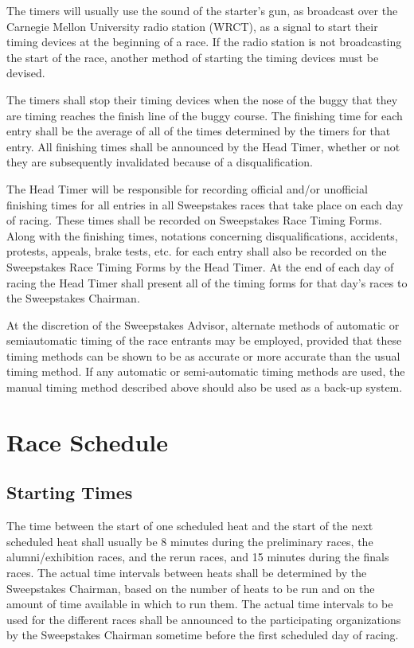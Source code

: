 	The timers will usually use the sound of the starter's gun, as broadcast over the Carnegie Mellon University radio station (WRCT), as a signal to start their timing devices at the beginning of a race. If the radio station is not broadcasting the start of the race, another method of starting the timing devices must be devised.

	The timers shall stop their timing devices when the nose of the buggy that they are timing reaches the finish line of the buggy course. The finishing time for each entry shall be the average of all of the times determined by the timers for that entry. All finishing times shall be announced by the Head Timer, whether or not they are subsequently invalidated because of a disqualification.

	The Head Timer will be responsible for recording official and/or unofficial finishing times for all entries in all Sweepstakes races that take place on each day of racing. These times shall be recorded on Sweepstakes Race Timing Forms. Along with the finishing times, notations concerning disqualifications, accidents, protests, appeals, brake tests, etc. for each entry shall also be recorded on the Sweepstakes Race Timing Forms by the Head Timer. At the end of each day of racing the Head Timer shall present all of the timing forms for that day's races to the Sweepstakes Chairman.

	At the discretion of the Sweepstakes Advisor, alternate methods of automatic or semiautomatic timing of the race entrants may be employed, provided that these timing methods can be shown to be as accurate or more accurate than the usual timing method. If any automatic or semi-automatic timing methods are used, the manual timing method described above should also be used as a back-up system.

\section{Race Schedule}

\subsection{Starting Times}

	The time between the start of one scheduled heat and the start of the next scheduled heat shall usually be 8 minutes during the preliminary races, the alumni/exhibition races, and the rerun races, and 15 minutes during the finals races. The actual time intervals between heats shall be determined by the Sweepstakes Chairman, based on the number of heats to be run and on the amount of time available in which to run them. The actual time intervals to be used for the different races shall be announced to the participating organizations by the Sweepstakes Chairman sometime before the first scheduled day of racing.

